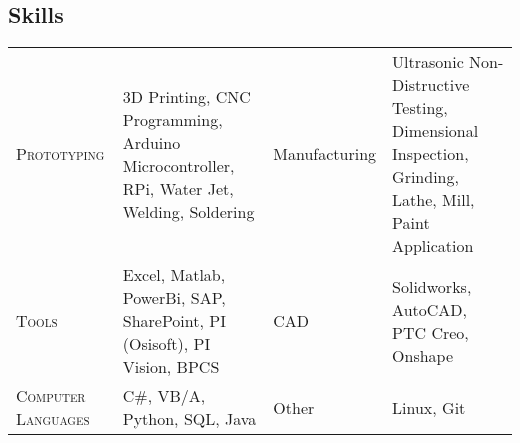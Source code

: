 \documentclass[a4paper, oneside, final, 10pt]{scrartcl} %
\newcommand{\Csharp}{C{\lserif\#}}
\begin{document}
\begin{center}
\section{Skills}
\begin{tabularx}{0.97\linewidth}{>{\raggedleft\scshape}p{4cm}X|p{2cm}X}
    Prototyping & 3D Printing, CNC Programming, Arduino Microcontroller, RPi, Water Jet, Welding, Soldering & Manufacturing & Ultrasonic Non-Distructive Testing, Dimensional Inspection, Grinding, Lathe, Mill, Paint Application\\
    Tools & Excel, Matlab, PowerBi, SAP, SharePoint, PI (Osisoft), PI Vision, BPCS & CAD & Solidworks, AutoCAD, PTC Creo, Onshape\\
    Computer Languages & \Csharp{}, VB/A, Python, SQL, Java & Other & Linux, Git\\
\end{tabularx}


\end{center}
\end{document}
